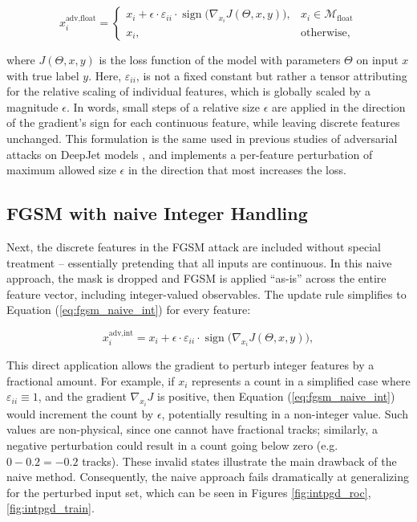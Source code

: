 \begin{equation}
x_i^{\text{adv,float}} = 
    \begin{cases}
        x_i + \epsilon \cdot \varepsilon_{ii} \cdot \operatorname{sign}\!\bigl(\nabla_{x_i} J(\Theta, x, y)\bigr), & x_i\in\mathcal{M}_{\text{float}} \\[6pt]
        x_i, & \text{otherwise},
    \end{cases}
\label{eq:fgsm}
\end{equation}

where $J(\Theta, x, y)$ is the loss function of the model with parameters $\Theta$ on input $x$ with true label $y$. 
Here, $\varepsilon_{ii}$, is not a fixed constant but rather a tensor attributing for the relative scaling of individual features, which is globally scaled by a magnitude $\epsilon$.  
In words, small steps of a relative size $\epsilon$ are applied in the direction of the gradient's sign for each continuous feature, while leaving discrete features unchanged. This formulation is the same used in previous studies of adversarial attacks on DeepJet models \cite{CMS-DP-2024-020}, and implements a per-feature perturbation of maximum allowed size $\epsilon$ in the direction that most increases the loss.

\subsection{FGSM with naive Integer Handling}

Next, the discrete features in the FGSM attack are included without special treatment – essentially pretending that all inputs are continuous. In this naive approach, the mask is dropped and FGSM is applied “as-is” across the entire feature vector, including integer-valued observables. The update rule simplifies to Equation (\ref{eq:fgsm_naive_int}) for every feature:

\begin{equation}
x_i^{\text{adv,int}} = x_i + \epsilon \cdot \varepsilon_{ii} \cdot \operatorname{sign}\!\bigl(\nabla_{x_i} J(\Theta, x, y)\bigr),
\label{eq:fgsm_naive_int}
\end{equation}

This direct application allows the gradient to perturb integer features by a fractional amount. For example, if $x_i$ represents a count in a simplified case where $\varepsilon_{ii}\equiv1$, and the gradient $\nabla_{x_i} J$ is positive, then Equation (\ref{eq:fgsm_naive_int}) would increment the count by $\epsilon$, potentially resulting in a non-integer value. Such values are non-physical, since one cannot have fractional tracks; similarly, a negative perturbation could result in a count going below zero (e.g. $0-0.2=-0.2$ tracks). These invalid states illustrate the main drawback of the naive method. Consequently, the naive approach fails dramatically at generalizing for the perturbed input set, which can be seen in Figures \ref{fig:intpgd_roc}, \ref{fig:intpgd_train}. 


